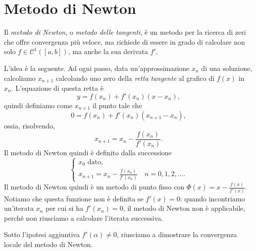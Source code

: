 \documentclass[a4paper]{report}
\theoremstyle{definiton}
\theoremstyle{remark}
\begin{document}
\section{Metodo di Newton}

Il \emph{metodo di Newton}, o \emph{metodo delle tangenti}, è un metodo per la ricerca di zeri che offre convergenza più veloce, ma richiede di essere in grado di calcolare non solo $f \in \mathcal{C}^1([a,b])$, ma anche la sua derivata $f'$.

L'idea è la seguente. Ad ogni passo, data un'approssimazione $x_n$ di una soluzione, calcoliamo $x_{n+1}$ calcolando uno zero della \emph{retta tangente} al grafico di $f(x)$ in $x_n$. L'equazione di questa retta è
\[
y = f(x_n) + f'(x_n) (x- x_n),
\]
quindi definiamo come $x_{n+1}$ il punto tale che
\[
0 = f(x_n) + f'(x_n) (x_{n+1}- x_n),
\]
ossia, risolvendo,
\[
x_{n+1} = x_n - \frac{f(x_n)}{f'(x_n)}.
\]
Il metodo di Newton quindi è definito dalla successione
\[
\begin{cases}
    x_0 \text{ dato},\\
    x_{n+1} = x_n - \frac{f(x_n)}{f'(x_n)} \quad n=0,1,2,\dots.
\end{cases}
\]
Il metodo di Newton quindi è un metodo di punto fisso con $\Phi(x) = x - \frac{f(x)}{f'(x)}$. Notiamo che questa funzione non è definita se $f'(x) = 0$: quando incontriamo un'iterata $x_n$ per cui si ha $f'(x_n) = 0$, il metodo di Newton non è applicabile, perché non riusciamo a calcolare l'iterata successiva.

Sotto l'ipotesi aggiuntiva $f'(\alpha) \neq 0$, riusciamo a dimostrare la convergenza locale del metodo di Newton.
\end{document}
